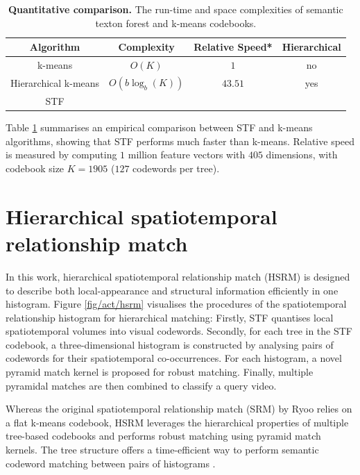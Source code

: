 \begin{table}
	\begin{center}
		\begin{tabular}{|c|c|c|c|}
			\hline
			\textbf{ Algorithm} & \textbf{ Complexity} & \textbf{ Relative Speed}* & \textbf{ Hierarchical} \\
			\hline
			k-means & $O(K)$ & $1$ & no \\
			Hierarchical k-means & $O(b\log_{b}(K))$ & $43.51$ & yes \\
			{STF} & \textbf{\color{blue}{ $ O(\log_{2}(K)) $ }} & \textbf{\color{blue}{$559.86$}} & \textbf{\color{blue}{yes}}\\
			\hline
		\end{tabular}
	\end{center}
	\caption{\textbf{Quantitative comparison.} The run-time and space complexities of semantic texton forest and k-means codebooks.}
	\label{tab/act/codebook}
\end{table}

Table \ref{tab/act/codebook} summarises an empirical comparison between STF and k-means algorithms, showing that STF performs much faster than k-means. Relative speed is measured by computing $1$ million feature vectors with $405$ dimensions, with codebook size $K = 1905$ ($127$ codewords per tree). 

\section{Hierarchical spatiotemporal relationship match}
\label{sec/act/HSRM}

In this work, hierarchical spatiotemporal relationship match (HSRM) is designed to describe both local-appearance and structural information efficiently in one histogram. 
Figure \ref{fig/act/hsrm} visualises the procedures of the spatiotemporal relationship histogram for hierarchical matching:   
Firstly, STF quantises local spatiotemporal volumes into visual codewords. 
Secondly, for each tree in the STF codebook, a three-dimensional histogram is constructed by analysing pairs of codewords for their spatiotemporal co-occurrences. 
For each histogram, a novel pyramid match kernel is proposed for robust matching. 
Finally, multiple pyramidal matches are then combined to classify a query video. 

Whereas the original spatiotemporal relationship match (SRM) by Ryoo \etal \cite{Ryoo2009} relies on a flat k-means codebook, HSRM leverages the hierarchical properties of multiple tree-based codebooks and performs robust matching using pyramid match kernels. The tree structure offers a time-efficient way to perform semantic codeword matching between pairs of histograms \cite{Grauman2005}.

